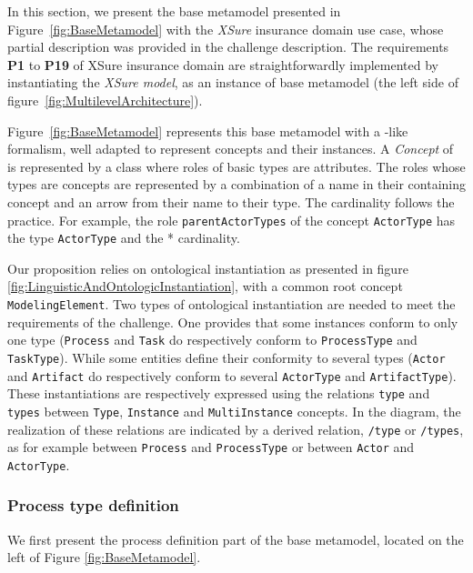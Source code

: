 In this section, we present the base metamodel presented in Figure~\ref{fig:BaseMetamodel} with the \textit{XSure} insurance domain use case, whose partial description was provided in the challenge description. The requirements \textbf{P1} to \textbf{P19} of XSure insurance domain are straightforwardly implemented by instantiating the \emph{XSure model}, as an instance of base metamodel (the left side of figure~\ref{fig:MultilevelArchitecture}).

Figure~\ref{fig:BaseMetamodel} represents this base metamodel with a \UML-like formalism, well adapted to represent \FML concepts and their instances. A \textit{Concept} of \FML is represented by a \UML class where roles of basic types are attributes. The roles whose types are concepts are represented by a combination of a name in their containing concept and an arrow from their name to their type. The cardinality follows the \UML practice.
For example, the role \texttt{parentActorTypes} of the concept \texttt{ActorType} has the type \texttt{ActorType} and the * cardinality.

Our proposition relies on ontological instantiation as presented in figure \ref{fig:LinguisticAndOntologicInstantiation}, with a common root concept \texttt{ModelingElement}. Two types of ontological instantiation are needed to meet the requirements of the challenge. One provides that some instances conform to only one type (\texttt{Process} and \texttt{Task} do respectively conform to \texttt{ProcessType} and \texttt{TaskType}). While some entities define their conformity to several types (\texttt{Actor} and \texttt{Artifact} do respectively conform to several \texttt{ActorType} and \texttt{ArtifactType}). These instantiations are respectively expressed using the relations \texttt{type} and \texttt{types} between \texttt{Type}, \texttt{Instance} and \texttt{MultiInstance} concepts. In the diagram, the realization of these relations are indicated by a derived relation, \texttt{/type} or \texttt{/types}, as for example between \texttt{Process} and \texttt{ProcessType} or between \texttt{Actor} and \texttt{ActorType}.

\subsubsection{Process type definition}

We first present the process definition part of the base metamodel, located on the left of Figure \ref{fig:BaseMetamodel}.


